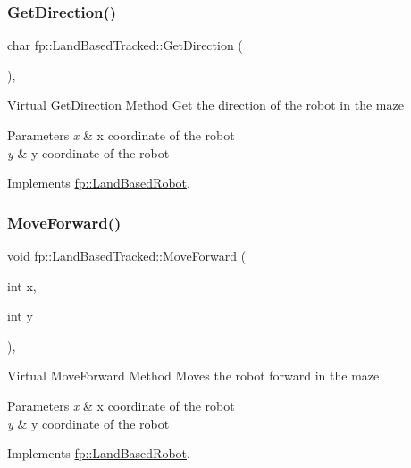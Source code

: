 \subsubsection{\texorpdfstring{Get\+Direction()}{GetDirection()}}
{\footnotesize\ttfamily char fp\+::\+Land\+Based\+Tracked\+::\+Get\+Direction (\begin{DoxyParamCaption}{ }\end{DoxyParamCaption})\hspace{0.3cm}{\ttfamily [override]}, {\ttfamily [virtual]}}

Virtual Get\+Direction Method Get the direction of the robot in the maze 
\begin{DoxyParams}{Parameters}
{\em x} & x coordinate of the robot \\
\hline
{\em y} & y coordinate of the robot \\
\hline
\end{DoxyParams}


Implements \hyperlink{classfp_1_1_land_based_robot_a50841b6e40d4e92832770d26b427fea2}{fp\+::\+Land\+Based\+Robot}.

\mbox{\label{classfp_1_1_land_based_tracked_a02145c5c1642c961f9c0cca1a4cf1b70}} 
\subsubsection{\texorpdfstring{Move\+Forward()}{MoveForward()}}
{\footnotesize\ttfamily void fp\+::\+Land\+Based\+Tracked\+::\+Move\+Forward (\begin{DoxyParamCaption}\item[{int}]{x,  }\item[{int}]{y }\end{DoxyParamCaption})\hspace{0.3cm}{\ttfamily [override]}, {\ttfamily [virtual]}}

Virtual Move\+Forward Method Moves the robot forward in the maze 
\begin{DoxyParams}{Parameters}
{\em x} & x coordinate of the robot \\
\hline
{\em y} & y coordinate of the robot \\
\hline
\end{DoxyParams}


Implements \hyperlink{classfp_1_1_land_based_robot_a25ed5c4c524e68cc983104a8da57599b}{fp\+::\+Land\+Based\+Robot}.


